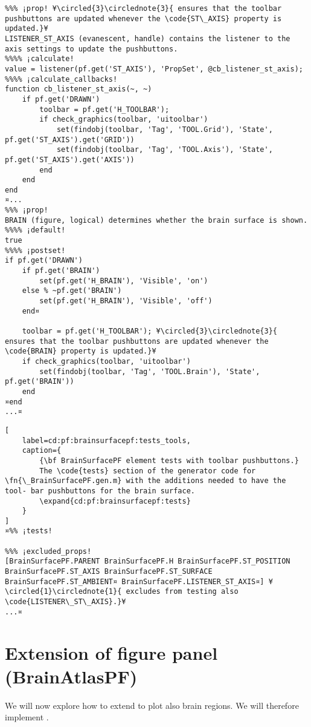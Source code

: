 \documentclass{tufte-handout}
\begin{document}
\begin{lstlisting}
%%% ¡prop! ¥\circled{3}\circlednote{3}{ ensures that the toolbar pushbuttons are updated whenever the \code{ST\_AXIS} property is updated.}¥
LISTENER_ST_AXIS (evanescent, handle) contains the listener to the axis settings to update the pushbuttons.
%%%% ¡calculate!
value = listener(pf.get('ST_AXIS'), 'PropSet', @cb_listener_st_axis); 
%%%% ¡calculate_callbacks!
function cb_listener_st_axis(~, ~)
    if pf.get('DRAWN')
        toolbar = pf.get('H_TOOLBAR');
        if check_graphics(toolbar, 'uitoolbar')
            set(findobj(toolbar, 'Tag', 'TOOL.Grid'), 'State', pf.get('ST_AXIS').get('GRID'))
            set(findobj(toolbar, 'Tag', 'TOOL.Axis'), 'State', pf.get('ST_AXIS').get('AXIS'))
        end
    end
end
¤...
%%% ¡prop!
BRAIN (figure, logical) determines whether the brain surface is shown.
%%%% ¡default!
true
%%%% ¡postset!
if pf.get('DRAWN')
    if pf.get('BRAIN')
        set(pf.get('H_BRAIN'), 'Visible', 'on')
    else % ~pf.get('BRAIN') 
        set(pf.get('H_BRAIN'), 'Visible', 'off')
    end¤

    toolbar = pf.get('H_TOOLBAR'); ¥\circled{3}\circlednote{3}{ ensures that the toolbar pushbuttons are updated whenever the \code{BRAIN} property is updated.}¥
    if check_graphics(toolbar, 'uitoolbar')
        set(findobj(toolbar, 'Tag', 'TOOL.Brain'), 'State', pf.get('BRAIN'))
    end
¤end
...¤
\end{lstlisting}

\begin{lstlisting}[
	label=cd:pf:brainsurfacepf:tests_tools,
	caption={
		{\bf BrainSurfacePF element tests with toolbar pushbuttons.}
		The \code{tests} section of the generator code for \fn{\_BrainSurfacePF.gen.m} with the additions needed to have the tool- bar pushbuttons for the brain surface.
		\expand{cd:pf:brainsurfacepf:tests}
	}
]
¤%% ¡tests!

%%% ¡excluded_props! 
[BrainSurfacePF.PARENT BrainSurfacePF.H BrainSurfacePF.ST_POSITION BrainSurfacePF.ST_AXIS BrainSurfacePF.ST_SURFACE BrainSurfacePF.ST_AMBIENT¤ BrainSurfacePF.LISTENER_ST_AXIS¤] ¥\circled{1}\circlednote{1}{ excludes from testing also \code{LISTENER\_ST\_AXIS}.}¥
...¤
\end{lstlisting}

\clearpage

\section{Extension of figure panel (BrainAtlasPF)}

We will now explore how to extend  to plot also brain regions. We will therefore implement .
\end{document}
